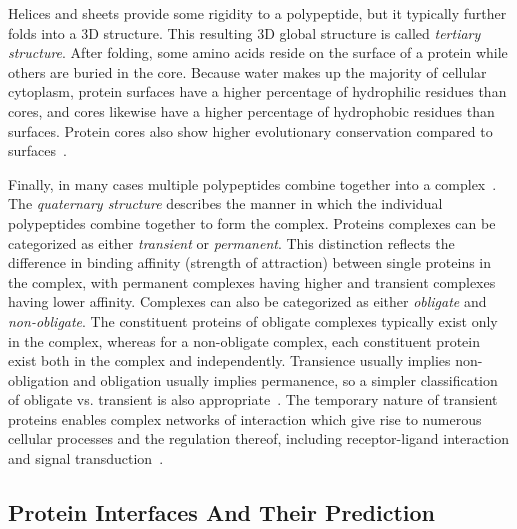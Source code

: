 Helices and sheets provide some rigidity to a polypeptide, but it typically further folds into a 3D structure.
This resulting 3D global structure is called \textit{tertiary structure}.
After folding, some amino acids reside on the surface of a protein while others are buried in the core.
Because water makes up the majority of cellular cytoplasm, protein surfaces have a higher percentage of hydrophilic residues than cores, and cores likewise have a higher percentage of hydrophobic residues than surfaces. 
Protein cores also show higher evolutionary conservation compared to surfaces~\cite{yan2008}.


Finally, in many cases multiple polypeptides combine together into a complex~\cite{scheeffink2003}.
The \textit{quaternary structure} describes the manner in which the individual polypeptides combine together to form the complex.
Proteins complexes can be categorized as either \textit{transient} or \textit{permanent}.
This distinction reflects the difference in binding affinity (strength of attraction) between single proteins in the complex, with permanent complexes having higher and transient complexes having lower affinity.
Complexes can also be categorized as either \textit{obligate} and \textit{non-obligate}.
The constituent proteins of obligate complexes typically exist only in the complex, whereas for a non-obligate complex, each constituent protein exist both in the complex and independently.
Transience usually implies non-obligation and obligation usually implies permanence, so a simpler classification of obligate vs. transient is also appropriate~\cite{jones1996}\cite{perkins2010}.
The temporary nature of transient proteins enables complex networks of interaction which give rise to numerous cellular processes and the regulation thereof, including receptor-ligand interaction and signal transduction~\cite{perkins2010}\cite{ofran2003}.


\subsection{Protein Interfaces And Their Prediction}



